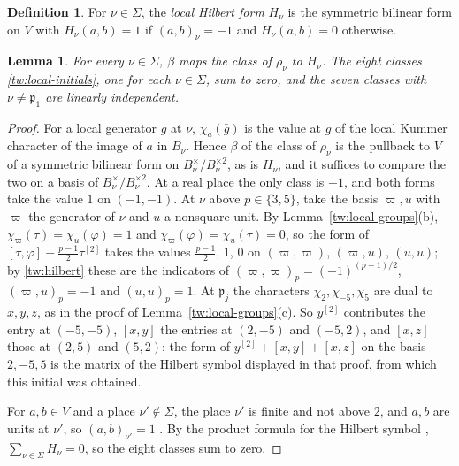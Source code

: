 \documentclass[11pt]{amsart}
\numberwithin{equation}{section}
\newtheorem{lemma}[equation]{Lemma}
\theoremstyle{definition}
\newtheorem{definition}[equation]{Definition}
\theoremstyle{remark}
\begin{document}
\begin{definition}\label{tw:hilbert-form}
For $\nu\in\Sigma$, the \emph{local Hilbert form} $H_\nu$ is the symmetric
bilinear form on $V$ with $H_\nu(a,b)=1$ if $(a,b)_\nu=-1$ and
$H_\nu(a,b)=0$ otherwise.
\end{definition}

\begin{lemma}\label{tw:local-forms}
For every $\nu\in\Sigma$, $\beta$ maps the class of $\rho_\nu$ to $H_\nu$. The
eight classes \eqref{tw:local-initials}, one for each $\nu\in\Sigma$, sum to
zero, and the seven classes with $\nu\ne\mathfrak p_1$ are linearly
independent.
\end{lemma}

\begin{proof}
For a local generator $g$ at $\nu$, $\chi_a(\bar g)$ is the value at $g$ of
the local Kummer character of the image of $a$ in $B_\nu$. Hence
$\beta$ of the class of $\rho_\nu$ is the pullback to $V$ of a symmetric
bilinear form on $B_\nu^\times/B_\nu^{\times2}$, as is $H_\nu$, and it
suffices to compare the two on a basis of $B_\nu^\times/B_\nu^{\times2}$. At a
real place the only class is $-1$, and both forms take the value $1$ on
$(-1,-1)$. At $\nu$ above $p\in\{3,5\}$, take the basis $\varpi,u$ with
$\varpi$ the generator of $\nu$ and $u$ a nonsquare unit. By
Lemma~\ref{tw:local-groups}(b), $\chi_\varpi(\tau)=\chi_u(\varphi)=1$ and
$\chi_\varpi(\varphi)=\chi_u(\tau)=0$, so the form of
$[\tau,\varphi]+\frac{p-1}2\tau^{[2]}$ takes the values $\frac{p-1}2$, $1$,
$0$ on $(\varpi,\varpi)$, $(\varpi,u)$, $(u,u)$; by \eqref{tw:hilbert} these
are the indicators of $(\varpi,\varpi)_p=(-1)^{(p-1)/2}$, $(\varpi,u)_p=-1$
and $(u,u)_p=1$. At $\mathfrak p_j$ the characters $\chi_2,\chi_{-5},\chi_5$
are dual to $x,y,z$, as in the proof of Lemma~\ref{tw:local-groups}(c). So
$y^{[2]}$ contributes the entry at $(-5,-5)$, $[x,y]$ the entries at $(2,-5)$
and $(-5,2)$, and $[x,z]$ those at $(2,5)$ and $(5,2)$: the form of
$y^{[2]}+[x,y]+[x,z]$ on the basis $2,-5,5$ is the matrix of the Hilbert
symbol displayed in that proof, from which this initial was obtained.

For $a,b\in V$ and a place $\nu'\notin\Sigma$, the place $\nu'$ is finite
and not above $2$, and $a,b$ are units at $\nu'$, so $(a,b)_{\nu'}=1$
\cite[Chapter~VIII, 5.8]{MilneCFT}. By the
product formula for the Hilbert symbol \cite[Chapter~V, Example~5.4]{MilneCFT},
$\sum_{\nu\in\Sigma}H_\nu=0$, so the eight classes sum to zero.


\end{proof}
\end{document}
